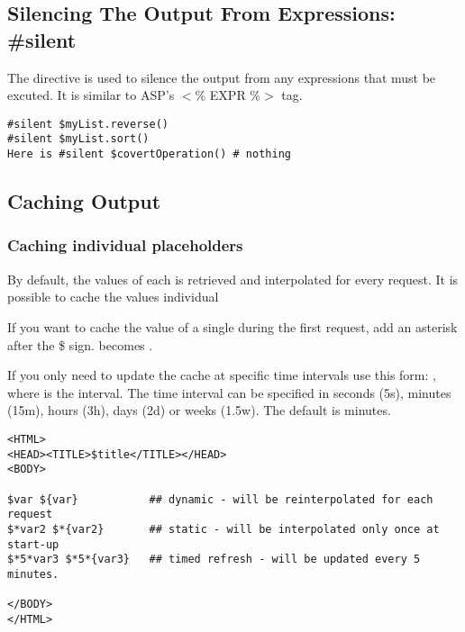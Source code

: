 \subsection{Silencing The Output From Expressions: \#silent}
\label{output.silent}

The  directive is used to silence the output from any
expressions that must be excuted.  It is similar to ASP's $<$\% EXPR \%$>$ tag.

\begin{verbatim}
#silent $myList.reverse()
#silent $myList.sort()
Here is #silent $covertOperation() # nothing
\end{verbatim}


\subsection{Caching Output}
\label{output.caching}

\subsubsection{Caching individual placeholders}
\label{output.caching.placeholders}

By default, the values of each  is retrieved and
interpolated for every request. It is possible to cache the values individual
                         
If you want to cache the value of a single  during the first
request, add an asterisk after the \$ sign.   becomes .

If you only need to update the cache at specific time intervals use this form:
 , where  is the interval.  The
time interval can be specified in seconds (5s), minutes (15m), hours (3h), days
(2d) or weeks (1.5w). The default is minutes.

\begin{verbatim}
<HTML>
<HEAD><TITLE>$title</TITLE></HEAD>
<BODY>

$var ${var}           ## dynamic - will be reinterpolated for each request
$*var2 $*{var2}       ## static - will be interpolated only once at start-up
$*5*var3 $*5*{var3}   ## timed refresh - will be updated every 5 minutes.

</BODY>
</HTML>
\end{verbatim}

